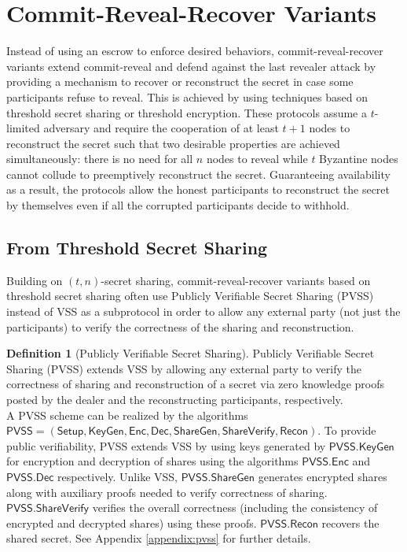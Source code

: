 \documentclass[letterpaper,twocolumn,10pt]{article}
\theoremstyle{definition}
\newtheorem{definition}[theorem]{Definition}
\theoremstyle{remark}
\begin{document}
\section{Commit-Reveal-Recover Variants}
\label{section:commit-reveal-recover}
Instead of using an escrow to enforce desired behaviors, commit-reveal-recover variants extend commit-reveal and defend against the last revealer attack by providing a mechanism to recover or reconstruct the secret in case some participants refuse to reveal. This is achieved by using techniques based on threshold secret sharing or threshold encryption. These protocols assume a $t$-limited adversary and require the cooperation of at least $t + 1$ nodes to reconstruct the secret such that two desirable properties are achieved simultaneously: there is no need for all $n$ nodes to reveal while $t$ Byzantine nodes cannot collude to preemptively reconstruct the secret. Guaranteeing availability as a result, the protocols allow the honest participants to reconstruct the secret by themselves even if all the corrupted participants decide to withhold.

\subsection{From Threshold Secret Sharing}
Building on $(t, n)$-secret sharing, commit-reveal-recover variants based on threshold secret sharing often use Publicly Verifiable Secret Sharing (PVSS) \cite{schoenmakers1999simple, cascudo2017scrape} instead of VSS as a subprotocol in order to allow any external party (not just the participants) to verify the correctness of the sharing and reconstruction.

\begin{definition}[Publicly Verifiable Secret Sharing]
Publicly Verifiable Secret Sharing (PVSS) extends VSS by allowing any external party to verify the correctness of sharing and reconstruction of a secret via zero knowledge proofs posted by the dealer and the reconstructing participants, respectively.\\
A PVSS scheme can be realized by the algorithms $\mathsf{PVSS} = (\mathsf{Setup}, \mathsf{KeyGen}, \mathsf{Enc}, \mathsf{Dec}, \mathsf{ShareGen}, \mathsf{ShareVerify}, \mathsf{Recon})$.
To provide public verifiability, PVSS extends VSS by using keys generated by $\mathsf{PVSS.KeyGen}$ for encryption and decryption of shares using the algorithms $\mathsf{PVSS.Enc}$ and $\mathsf{PVSS.Dec}$ respectively. Unlike VSS, $\mathsf{PVSS.ShareGen}$ generates encrypted shares along with auxiliary proofs needed to verify correctness of sharing. $\mathsf{PVSS.ShareVerify}$ verifies the overall correctness (including the consistency of encrypted and decrypted shares) using these proofs. $\mathsf{PVSS.Recon}$ recovers the shared secret. See Appendix \ref{appendix:pvss} for further details.
\end{definition}
\end{document}
